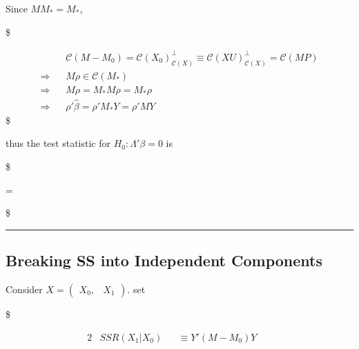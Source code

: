 \documentclass[
]{book}
\begin{document}
{{{Since \(M M_\ast = M_\ast\),

\$

\begin{align}

&\mathcal{C}(M - M_0) = \mathcal{C}(X_0)_{\mathcal{C}(X)}^\perp \equiv \mathcal{C}(XU)_{\mathcal{C}(X)}^\perp = \mathcal{C}(MP)

\\

\Longrightarrow \; \; \; 

&M \rho \in \mathcal{C}(M_\ast)


\\

\Longrightarrow \; \; \; 

&M \rho = M_\ast M \rho =  M_\ast \rho


\\

\Longrightarrow \; \; \; 

&\rho ' \hat \beta = \rho ' M_\ast Y = \rho ' M Y 



\end{align}
\$

thus the test statistic for \(H_0 : \Lambda ' \beta = 0\) is

\$


=


\$

\begin{center}\rule{0.5\linewidth}{0.5pt}\end{center}

\hypertarget{breaking-ss-into-independent-components}{%
\subsection{Breaking SS into Independent Components}\label{breaking-ss-into-independent-components}}

Consider \(X = \begin{pmatrix} X_0, & X_1 \end{pmatrix}\). set

\$

\begin{alignat}{2}
&SSR(X_1 \vert X_0) &&\equiv Y ' (M-M_0)Y && \tag{Sum of Squares for regression X1 after X0}\\


\end{alignat}}}}
\end{document}
